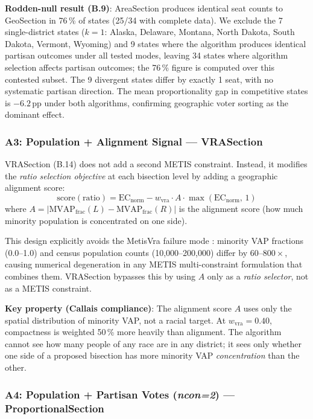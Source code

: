 \textbf{Rodden-null result (B.9)}: AreaSection produces identical seat counts to
GeoSection in 76\,\% of states (25/34 with complete data).
We exclude the 7 single-district states ($k=1$: Alaska, Delaware, Montana,
North Dakota, South Dakota, Vermont, Wyoming) and 9 states where the algorithm
produces identical partisan outcomes under all tested modes, leaving 34 states
where algorithm selection affects partisan outcomes; the 76\,\% figure is
computed over this contested subset.
The 9 divergent states differ by exactly 1 seat, with no systematic partisan direction.
The mean proportionality gap in competitive states is $-6.2$\,pp under both
algorithms, confirming geographic voter sorting as the dominant effect.

\subsubsection*{A3: Population + Alignment Signal --- VRASection}

VRASection (B.14) does not add a second METIS constraint.
Instead, it modifies the \emph{ratio selection objective} at each bisection level
by adding a geographic alignment score:
\[
  \text{score}(\text{ratio}) = \mathrm{EC}_\text{norm} - w_\text{vra}
  \cdot A \cdot \max(\mathrm{EC}_\text{norm},\, 1)
\]
where $A = |\text{MVAP}_\text{frac}(L) - \text{MVAP}_\text{frac}(R)|$
is the alignment score (how much minority population is concentrated on one side).

This design explicitly avoids the MetisVra failure mode \citep{b3paper}:
minority VAP fractions (0.0--1.0) and census population counts (10,000--200,000)
differ by $60$--$800\times$, causing numerical degeneration in any METIS
multi-constraint formulation that combines them.
VRASection bypasses this by using $A$ only as a \emph{ratio selector}, not as
a METIS constraint.

\textbf{Key property (Callais compliance)}: The alignment score $A$ uses only
the spatial distribution of minority VAP, not a racial target.
At $w_\text{vra} = 0.40$, compactness is weighted 50\,\% more heavily than
alignment.
The algorithm cannot see how many people of any race are in any district;
it sees only whether one side of a proposed bisection has more minority VAP
\emph{concentration} than the other.

\subsubsection*{A4: Population + Partisan Votes (\textit{ncon=2}) --- ProportionalSection}

